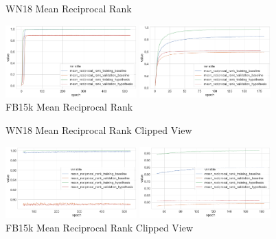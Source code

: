 \begin{figure}[H]
	\parbox{.5\linewidth}{
   		\caption{WN18 Mean Reciprocal Rank}
   		\centering
    		\includegraphics[width=0.45\textwidth, height=0.2\textheight]{WN18_mean_reciprocal_rank_Results}
		}
	\hfill
	\parbox{.5\linewidth}{
		\caption{FB15k Mean Reciprocal Rank}
   		\centering
		\includegraphics[width=0.45\textwidth, height=0.2\textheight]{FB15k_mean_reciprocal_rank_Results}
		}
\end{figure}

\begin{figure}[H]
	\parbox{.5\linewidth}{
   		\caption{WN18 Mean Reciprocal Rank Clipped View}
   		\centering
    		\includegraphics[width=0.45\textwidth, height=0.2\textheight]{WN18_mean_reciprocal_rank_Results_Clipped}
		}
	\hfill
	\parbox{.5\linewidth}{
		\caption{FB15k Mean Reciprocal Rank Clipped View}
   		\centering
		\includegraphics[width=0.45\textwidth, height=0.2\textheight]{FB15k_mean_reciprocal_rank_Results_Clipped}
		}
\end{figure}


